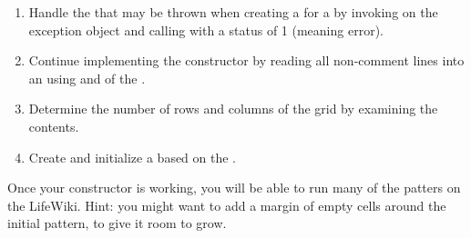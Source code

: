 \begin{exercise}
\begin{enumerate}
\item Handle the  that may be thrown when creating a  for a  by invoking  on the exception object and calling  with a status of 1 (meaning error).

\item Continue implementing the constructor by reading all non-comment lines into an  using  and  of the .

\item Determine the number of rows and columns of the grid by examining the  contents.

\item Create and initialize a  based on the .

\end{enumerate}

Once your constructor is working, you will be able to run many of the patters on the LifeWiki.
Hint: you might want to add a margin of empty cells around the initial pattern, to give it room to grow.

\end{exercise}


